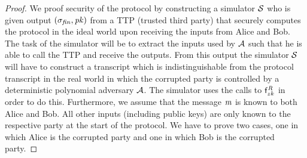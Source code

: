 \begin{proof}
    \label{prf:sig:two-party-security}
    We proof security of the protocol by constructing a simulator $\mathcal{S}$ who is given output $(\sigma_{\mathit{fin}}, \mathit{pk})$ from a TTP (trusted third party) that securely computes the protocol in the ideal world upon receiving the inputs from Alice and Bob.
    The task of the simulator will be to extract the inputs used by $\mathcal{A}$ such that he is able to call the TTP and receive the outputs.
    From this output the simulator $\mathcal{S}$ will have to construct a transcript which is indistinguishable from the protocol transcript in the real world in which the corrupted party is controlled by a deterministic polynomial adversary $\mathcal{A}$.
    The simulator uses the calls to $\mathsf{f}^{\mathit{R}}_{zk}$ in order to do this.
    Furthermore, we assume that the message $\mathit{m}$ is known to both Alice and Bob.
    All other inputs (including public keys) are only known to the respective party at the start of the protocol.
    We have to prove two cases, one in which Alice is the corrupted party and one in which Bob is the corrupted party.
    

\end{proof}

